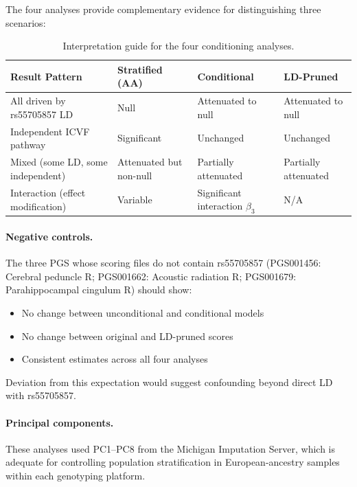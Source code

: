 \documentclass[11pt,a4paper]{article}
\begin{document}
The four analyses provide complementary evidence for distinguishing three scenarios:

\begin{table}[H]
\centering
\small
\begin{tabular}{p{4cm}p{3.5cm}p{3.5cm}p{3.5cm}}
\toprule
\textbf{Result Pattern} & \textbf{Stratified (AA)} & \textbf{Conditional} & \textbf{LD-Pruned} \\
\midrule
All driven by rs55705857 LD & Null & Attenuated to null & Attenuated to null \\
\addlinespace
Independent ICVF pathway & Significant & Unchanged & Unchanged \\
\addlinespace
Mixed (some LD, some independent) & Attenuated but non-null & Partially attenuated & Partially attenuated \\
\addlinespace
Interaction (effect modification) & Variable & Significant interaction $\beta_3$ & N/A \\
\bottomrule
\end{tabular}
\caption{Interpretation guide for the four conditioning analyses.}
\end{table}

\paragraph{Negative controls.} The three PGS whose scoring files do not contain rs55705857 (PGS001456: Cerebral peduncle R; PGS001662: Acoustic radiation R; PGS001679: Parahippocampal cingulum R) should show:
\begin{itemize}
  \item No change between unconditional and conditional models
  \item No change between original and LD-pruned scores
  \item Consistent estimates across all four analyses
\end{itemize}
Deviation from this expectation would suggest confounding beyond direct LD with rs55705857.

\paragraph{Principal components.} These analyses used PC1--PC8 from the Michigan Imputation Server, which is adequate for controlling population stratification in European-ancestry samples within each genotyping platform.

\end{document}
